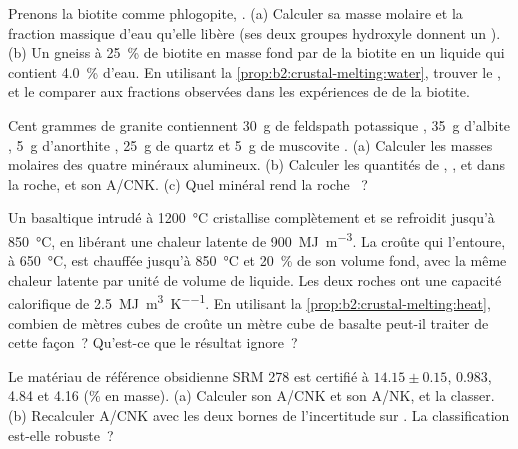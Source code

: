 \begin{exercise}[$\star\star$]\label{exo:b2:crustal-melting:5}
Prenons la biotite comme phlogopite, . (a) Calculer sa masse molaire et la
fraction massique d'eau qu'elle libère (ses deux groupes hydroxyle donnent un ).
(b) Un gneiss à \qty{25}{\percent} de biotite en masse fond par  de la biotite
en un liquide qui contient \qty{4.0}{\percent} d'eau. En utilisant la
\cref{prop:b2:crustal-melting:water}, trouver le , et le comparer aux
fractions observées dans les expériences de  de la biotite.
\end{exercise}

\begin{exercise}[$\star\star$]\label{exo:b2:crustal-melting:6}
Cent grammes de granite contiennent \qty{30}{\gram} de feldspath potassique ,
\qty{35}{\gram} d'albite , \qty{5}{\gram} d'anorthite ,
\qty{25}{\gram} de quartz et \qty{5}{\gram} de muscovite .
(a) Calculer les masses molaires des quatre minéraux alumineux. (b) Calculer les quantités de
, ,  et  dans la roche, et son A/CNK. (c) Quel
minéral rend la roche ~?
\end{exercise}

\begin{exercise}[$\star\star$]\label{exo:b2:crustal-melting:7}
Un  basaltique intrudé à \qty{1200}{\celsius} cristallise complètement et se refroidit jusqu'à
\qty{850}{\celsius}, en libérant une chaleur latente de \qty{900}{\mega\joule\per\cubic\metre}.
La croûte qui l'entoure, à \qty{650}{\celsius}, est chauffée jusqu'à \qty{850}{\celsius} et
\qty{20}{\percent} de son volume fond, avec la même chaleur latente par unité de volume de liquide. Les deux
roches ont une capacité calorifique de \qty{2.5}{\mega\joule\per\cubic\metre\per\kelvin}. En utilisant
la \cref{prop:b2:crustal-melting:heat}, combien de mètres cubes de croûte un mètre cube de basalte peut-il
traiter de cette façon~? Qu'est-ce que le résultat ignore~?
\end{exercise}

\begin{exercise}[$\star\star$]\label{exo:b2:crustal-melting:8}
Le matériau de référence obsidienne SRM 278 est certifié à 
$14.15 \pm 0.15$,  0.983,  4.84 et  4.16 (\unit{\percent} en
masse). (a) Calculer son A/CNK et son A/NK, et la classer. (b) Recalculer A/CNK avec les deux
bornes de l'incertitude sur . La classification est-elle robuste~?
\end{exercise}

